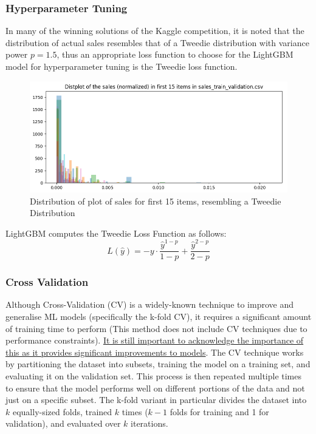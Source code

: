 \documentclass[12pt]{article}
\begin{document}
\subsubsection*{Hyperparameter Tuning}

In many of the winning solutions of the Kaggle competition, it is noted that the distribution of actual sales resembles that of a Tweedie distribution with variance power $p =1.5$, thus an appropriate loss function to choose for the LightGBM model for hyperparameter tuning is the Tweedie loss function. 

\begin{figure}[H]
    \centering
    \includegraphics[width=\textwidth]{Images/tweediedist.png}
    \caption{Distribution of plot of sales for first 15 items, resembling a Tweedie Distribution}
    \label{fig:6-tweedie}
\end{figure} 

\noindent LightGBM computes the Tweedie Loss Function as follows: \begin{equation}
    L(\hat{y}) = -y \cdot \frac{\hat{y}^{1-p}}{1-p} + \frac{\hat{y}^{2-p}}{2-p}
\end{equation}

\subsubsection*{Cross Validation}

Although Cross-Validation (CV) is a widely-known technique to improve and generalise ML models (specifically the k-fold CV), it requires a significant amount of training time to perform (This method does not include CV techniques due to performance constraints). \href{https://www.kaggle.com/c/m5-forecasting-accuracy/discussion/166814}{It is still important to acknowledge the importance of this as it provides significant improvements to models}. The CV technique works by partitioning the dataset into subsets, training the model on a training set, and evaluating it on the validation set. This process is then repeated multiple times to ensure that the model performs well on different portions of the data and not just on a specific subset. The k-fold variant in particular divides the dataset into $k$ equally-sized folds, trained $k$ times ($k-1$ folds for training and 1 for validation), and evaluated over $k$ iterations. 
\end{document}
